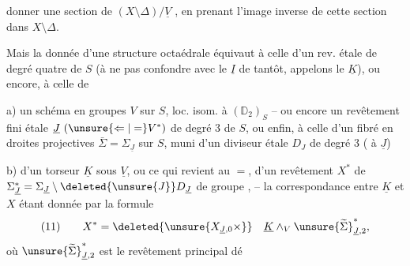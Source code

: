 donner une section de $(X\setminus\Delta)/\underline V$ , en prenant  l'image inverse de cette section dans $X\setminus\Delta$.

Mais la donnée d'une structure octaédrale équivaut à celle d'un  rev. étale de degré quatre de $S$ (à ne pas confondre avec le $\underline I$ de tantôt, appelons le $\underline K$), ou encore, à celle de

 a) un schéma en groupes $V$ sur $S$, loc. isom. à $(\mathbb D_2)_S$ -- ou encore un revêtement fini étale $\underline J\ (\unsure{\Leftarrow|=}V^*)$ de degré $3$ de $S$, ou  enfin, à celle d'un  fibré en droites projectives $\bar\Sigma=\Sigma_{\underline J}$ sur $S$, muni d'un diviseur  étale $D_J$ de degré $3$ (  à $\underline J$)

 b) d'un torseur $\underline K$ sous $\underline V$, ou ce qui revient au $=$, d'un revêtement   $X^*$ de $\Sigma^*_{\underline J}=\Sigma_{\underline J}\setminus\deleted{\unsure{J}}D_{\underline J}$ de groupe  ,   -- la correspondance entre $\underline K$ et $X$ étant donnée par la formule
\[
(11)\qquad X^*=\deleted{\unsure{X_{\underline J,0}\times}}\quad \underline K\wedge_V\unsure{\widetilde\Sigma}_{\underline J,2}^*,
\]
où $\unsure{\widetilde\Sigma}_{\underline J,2}^*$ est le revêtement principal dé

